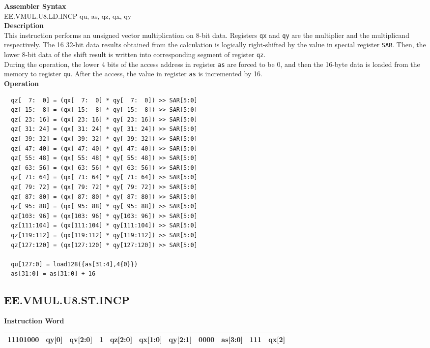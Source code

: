 \textbf{Assembler Syntax} \\
EE.VMUL.U8.LD.INCP qu, as, qz, qx, qy \\
\textbf{Description} \\
This instruction performs an unsigned vector multiplication on 8-bit data. Registers \lstinline{qx} and \lstinline{qy} are the multiplier and the multiplicand respectively. The 16 32-bit data results obtained from the calculation is logically right-shifted by the value in special register \lstinline{SAR}. Then, the lower 8-bit data of the shift result is written into corresponding segment of register \lstinline{qz}. \\ During the operation, the lower 4 bits of the access address in register \lstinline{as} are forced to be 0, and then the 16-byte data is loaded from the memory to register \lstinline{qu}. After the access, the value in register \lstinline{as} is incremented by 16.\\
\textbf{Operation}
\begin{lstlisting}
  qz[  7:  0] = (qx[  7:  0] * qy[  7:  0]) >> SAR[5:0]
  qz[ 15:  8] = (qx[ 15:  8] * qy[ 15:  8]) >> SAR[5:0]
  qz[ 23: 16] = (qx[ 23: 16] * qy[ 23: 16]) >> SAR[5:0]
  qz[ 31: 24] = (qx[ 31: 24] * qy[ 31: 24]) >> SAR[5:0]
  qz[ 39: 32] = (qx[ 39: 32] * qy[ 39: 32]) >> SAR[5:0]
  qz[ 47: 40] = (qx[ 47: 40] * qy[ 47: 40]) >> SAR[5:0]
  qz[ 55: 48] = (qx[ 55: 48] * qy[ 55: 48]) >> SAR[5:0]
  qz[ 63: 56] = (qx[ 63: 56] * qy[ 63: 56]) >> SAR[5:0]
  qz[ 71: 64] = (qx[ 71: 64] * qy[ 71: 64]) >> SAR[5:0]
  qz[ 79: 72] = (qx[ 79: 72] * qy[ 79: 72]) >> SAR[5:0]
  qz[ 87: 80] = (qx[ 87: 80] * qy[ 87: 80]) >> SAR[5:0]
  qz[ 95: 88] = (qx[ 95: 88] * qy[ 95: 88]) >> SAR[5:0]
  qz[103: 96] = (qx[103: 96] * qy[103: 96]) >> SAR[5:0]
  qz[111:104] = (qx[111:104] * qy[111:104]) >> SAR[5:0]
  qz[119:112] = (qx[119:112] * qy[119:112]) >> SAR[5:0]
  qz[127:120] = (qx[127:120] * qy[127:120]) >> SAR[5:0]

  qu[127:0] = load128({as[31:4],4{0}})
  as[31:0] = as[31:0] + 16
\end{lstlisting}

\clearpage
\subsection{EE.VMUL.U8.ST.INCP}\label{instruction:EEVMULU8STINCP}
\setlength\tabcolsep{6pt}
\textbf{Instruction Word} \\
\begin{tabular}{|c|c|c|c|c|c|c|c|c|c|c|}
	\hline
	11101000 & qy[0] & qv[2:0] & 1 & qz[2:0] & qx[1:0] & qy[2:1] & 0000 & as[3:0] & 111 & qx[2] \\
	\hline
\end{tabular}

